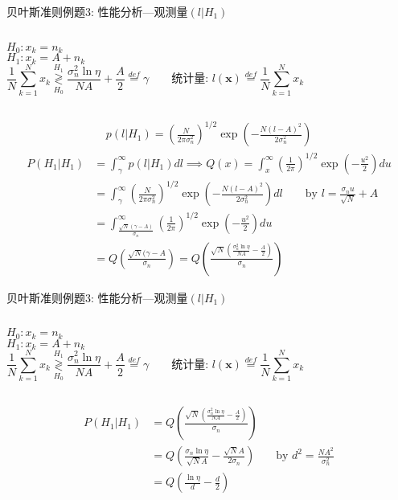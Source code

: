 \begin{frame}[shrink]{贝叶斯准则例题3: 性能分析---观测量$(l|H_1)$}
\begin{columns}
	$H_0:x_k=n_k$\\
	$H_1:x_k=A+n_k$
	\[
	\frac{1}{N}\sum\limits_{k=1}^{N}x_k\mathop{\gtrless}\limits_{H_0}^{H_1}\frac{\sigma_n^2\ln\eta}{NA}+\frac{A}{2}\mathop{=}\limits^{def}\gamma \qquad \textbf{统计量: }l(\bm{x})\mathop{=}\limits^{def}\frac{1}{N}\sum\limits_{k=1}^{N}x_k
	\]
\end{columns}
\begin{align*}
p(l|H_1)=\left(\frac{N}{2\pi\sigma_n^2}\right)^{1/2}\exp\left(-\frac{N(l-A)^2}{2\sigma_n^2}\right)
\end{align*}
\begin{align*}
P(H_1|H_1)&=\int_{\gamma}^{\infty}p(l|H_1)dl\implies Q(x)=\int_{x}^{\infty}\left(\frac{1}{2\pi}\right)^{1/2}\exp\left(-\frac{u^2}{2}\right)du\\
&=\int_{\gamma}^{\infty}\left(\frac{N}{2\pi\sigma_n^2}\right)^{1/2}\exp\left(-\frac{N(l-A)^2}{2\sigma_n^2}\right)dl\qquad \text{by } l=\frac{\sigma_nu}{\sqrt{N}}+A\\
&=\int_{\frac{\sqrt{N}(\gamma-A)}{\sigma_n}}^{\infty}\left(\frac{1}{2\pi}\right)^{1/2}\exp\left(-\frac{u^2}{2}\right)du\\
&=Q\left(\frac{\sqrt{N}(\gamma-A}{\sigma_n}\right)=Q\left(\frac{\sqrt{N}\left(\frac{\sigma_n^2\ln\eta}{NA}-\frac{A}{2}\right)}{\sigma_n}\right)
\end{align*}
\end{frame}

\begin{frame}[shrink]{贝叶斯准则例题3: 性能分析---观测量$(l|H_1)$}
\begin{columns}
$H_0:x_k=n_k$\\
$H_1:x_k=A+n_k$
\[
\frac{1}{N}\sum\limits_{k=1}^{N}x_k\mathop{\gtrless}\limits_{H_0}^{H_1}\frac{\sigma_n^2\ln\eta}{NA}+\frac{A}{2}\mathop{=}\limits^{def}\gamma \qquad \textbf{统计量: }l(\bm{x})\mathop{=}\limits^{def}\frac{1}{N}\sum\limits_{k=1}^{N}x_k
\]
\end{columns}
\begin{align*}
P(H_1|H_1)&=Q\left(\frac{\sqrt{N}\left(\frac{\sigma_n^2\ln\eta}{NA}-\frac{A}{2}\right)}{\sigma_n}\right)\\
&=Q\left(\frac{\sigma_n\ln\eta}{\sqrt{N}A}-\frac{\sqrt{N}A}{2\sigma_n}\right)&& \text{by }d^2=\frac{NA^2}{\sigma_n^2}\\
&=Q\left(\frac{\ln\eta}{d}-\frac{d}{2}\right)
\end{align*}
\end{frame}

